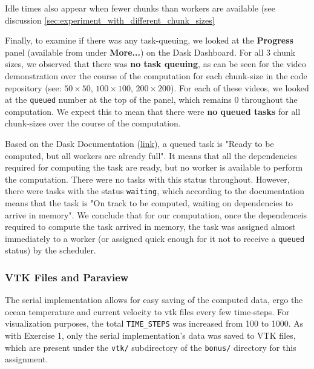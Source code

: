 \documentclass[a4paper,12pt]{article}
\begin{document}
\begin{itemize}
  Idle times also appear when fewer chunks than workers are available (see discussion \ref{sec:experiment_with_different_chunk_sizes}

  Finally, to examine if there was any task-queuing, we looked at the \textbf{Progress} panel (available from under \textbf{More...}) on the Dask Dashboard.
  For all 3 chunk sizes, we observed that there was \textbf{no task queuing}, as can be seen for the video demonstration over the course of the computation for each chunk-size in the code repository (see: \href{https://github.com/paulmyr/DD2358-HPC25/tree/master/04_parallel/bonus#chunk-size-50-1}{$50 \times 50$}, \href{https://github.com/paulmyr/DD2358-HPC25/tree/master/04_parallel/bonus#chunk-size-100-1}{$100 \times 100$}, \href{https://github.com/paulmyr/DD2358-HPC25/tree/master/04_parallel/bonus#chunk-size-200-1}{$200 \times 200$}).
  For each of these videos, we looked at the \verb|queued| number at the top of the panel, which remains 0 throughout the computation.
  We expect this to mean that there were \textbf{no queued tasks} for all chunk-sizes over the course of the computation.

  Based on the Dask Documentation (\href{https://distributed.dask.org/en/stable/scheduling-state.html#task-state}{link}), a queued task is "Ready to be computed, but all workers are already full".
  It means that all the dependencies required for computing the task are ready, but no worker is available to perform the computation.
  There were no tasks with this status throughout.
  However, there were tasks with the status \verb|waiting|, which according to the documentation means that the task is "On track to be computed, waiting on dependencies to arrive in memory".
  We conclude that for our computation, once the dependenceis required to compute the task arrived in memory, the task was assigned almost immediately to a worker (or assigned quick enough for it not to receive a \verb|queued| status) by the scheduler.
\end{itemize}

\subsubsection{VTK Files and Paraview}
The serial implementation allows for easy saving of the computed data, ergo the ocean temperature and current velocity to vtk files every few time-steps.
For visualization purposes, the total \verb|TIME_STEPS| was increased from 100 to 1000.
As with Exercise 1, only the serial implementation's data was saved to VTK files, which are present under the \verb|vtk/| subdirectory of the \verb|bonus/| directory for this assignment.
\end{document}
